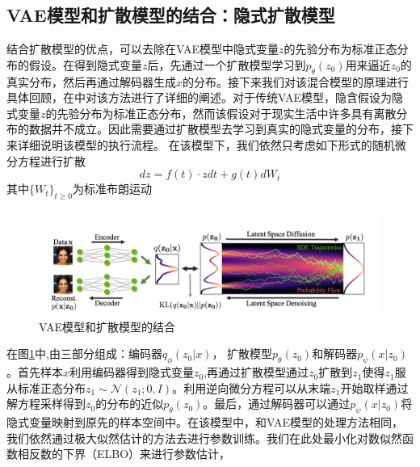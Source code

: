 \subsection{VAE模型和扩散模型的结合：隐式扩散模型}
结合扩散模型的优点，可以去除在VAE模型中隐式变量$z$的先验分布为标准正态分布的假设。在得到隐式变量$z$后，先通过一个扩散模型学习到$p_{\theta}(z_0)$用来逼近$z_0$的真实分布，然后再通过解码器生成$x$的分布。接下来我们对该混合模型的原理进行具体回顾，在\cite{VAE_diffusion}中对该方法进行了详细的阐述。对于传统VAE模型，隐含假设为隐式变量$z$的先验分布为标准正态分布，然而该假设对于现实生活中许多具有离散分布的数据并不成立。因此需要通过扩散模型去学习到真实的隐式变量的分布，接下来详细说明该模型的执行流程。
在该模型下，我们依然只考虑如下形式的随机微分方程进行扩散
\begin{equation}
    dz = f(t)\cdot zdt + g(t)dW_t
    \label{SDE form }
\end{equation}
其中$\{W_t\}_{t\geq 0}$为标准布朗运动
\begin{figure}[H]
    \centering
    \includegraphics[scale = 0.5]{ThuThesis_ Tsinghua University Thesis LaTeX Template/Picture/VAE_diffusion.png}
    \caption{VAE模型和扩散模型的结合}
    \label{fig_VAE_Diffusion}
\end{figure}
在图\ref{fig_VAE_Diffusion}中,由三部分组成：编码器$q_{\phi}(z_0|x)$， 扩散模型$p_{\theta}(z_0)$和解码器$p_{\psi}(x|z_0)$。首先样本$x$利用编码器得到隐式变量$z_0$,再通过扩散模型通过$z_0$扩散到$z_1$使得$z_1$服从标准正态分布$z_1\sim \mathcal{N}(z_1;0,I)$。利用逆向微分方程可以从末端$z_1$开始取样通过解方程采样得到$z_0$的分布的近似$p_{\theta}(z_0)$。最后，通过解码器可以通过$p_{\psi}(x|z_0)$将隐式变量映射到原先的样本空间中。在该模型中，和VAE模型的处理方法相同，我们依然通过极大似然估计的方法去进行参数训练。我们在此处最小化对数似然函数相反数的下界（ELBO）来进行参数估计，
